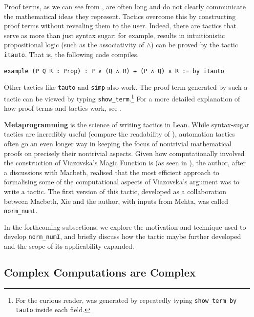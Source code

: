 Proof terms, as we can see from , are often long and do not clearly communicate the mathematical ideas they represent. Tactics overcome this by constructing proof terms without revealing them to the user. Indeed, there are tactics that serve as more than just syntax sugar: for example, results in intuitionistic propositional logic (such as the associativity of $\land$) can be proved by the tactic \lstinline|itauto|. That is, the following code compiles.


\begin{lstlisting}[caption=A one-line tactic proof for the associativity of $\land$, label=Ch5:Listing:And_assoc_itauto]
example (P Q R : Prop) : P ∧ (Q ∧ R) ↔ (P ∧ Q) ∧ R := by itauto
\end{lstlisting}

Other tactics like \lstinline|tauto| and \lstinline|simp| also work. The proof term generated by such a tactic can be viewed by typing \lstinline|show_term|.\footnote{For the curious reader,  was generated by repeatedly typing \lstinline|show_term by tauto| inside each field.} For a more detailed explanation of how proof terms and tactics work, see \cite[particularly Chapters 3 and 5]{ThmPfInLean}.

\textbf{Metaprogramming} is the science of writing tactics in Lean. While syntax-sugar tactics are incredibly useful (compare the readability of ), automation tactics often go an even longer way in keeping the focus of nontrivial mathematical proofs on precisely their nontrivial aspects. Given how computationally involved the construction of Viazovska's Magic Function is (as seen in ), the author, after a discussions with Macbeth, realised that the most efficient approach to formalising some of the computational aspects of Viazovska's argument was to write a tactic. The first version of this tactic, developed as a collaboration between Macbeth, Xie and the author, with inputs from Mehta, was called \lstinline|norm_numI|.

In the forthcoming subsections, we explore the motivation and technique used to develop \lstinline|norm_numI|, and briefly discuss how the tactic maybe further developed and the scope of its applicability expanded.

\subsection{Complex Computations are Complex}

